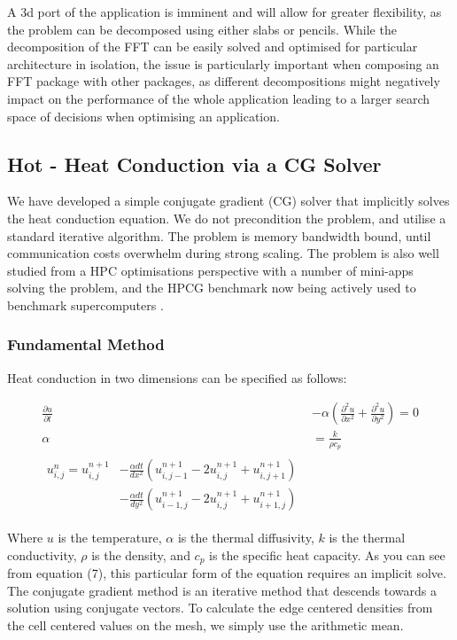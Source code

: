 \documentclass[runningheads,a4paper]{llncs}
\begin{document}
A 3d port of the application is imminent and will allow for greater flexibility, as the problem can be decomposed using either slabs or pencils. While the decomposition of the FFT can be easily solved and optimised for particular architecture in isolation, the issue is particularly important when composing an FFT package with other packages, as different decompositions might negatively impact on the performance of the whole application leading to a larger search space of decisions when optimising an application.

\subsection{Hot - Heat Conduction via a CG Solver}

\label{sec:hot}

We have developed a simple conjugate gradient (CG) solver that implicitly solves the heat conduction equation. We do not precondition the problem, and utilise a standard iterative algorithm. The problem is memory bandwidth bound, until communication costs overwhelm during strong scaling. The problem is also well studied from a HPC optimisations perspective with a number of mini-apps solving the problem, and the HPCG benchmark now being actively used to benchmark supercomputers \cite{Dongarra2013}.

\subsubsection{Fundamental Method}

Heat conduction in two dimensions can be specified as follows:

\begin{align}
    \frac{\partial u}{\partial t} &- \alpha \left(\frac{\partial^2u}{\partial x^2} + \frac{\partial^2u}{\partial y^2}\right) = 0 \\ 
    \alpha &= \frac{k}{\rho c_p} \\
  \begin{split}
    u^n_{i,j} = u^{n+1}_{i,j} 
    & - \frac{\alpha dt}{dx^2}(u^{n+1}_{i,j-1} - 2u^{n+1}_{i,j} + u^{n+1}_{i,j+1}) \\
    & - \frac{\alpha dt}{dy^2}(u^{n+1}_{i-1,j} - 2u^{n+1}_{i,j} + u^{n+1}_{i+1,j})
  \end{split}
\end{align}

Where $u$ is the temperature, $\alpha$ is the thermal diffusivity, $k$ is the thermal conductivity, $\rho$ is the density, and $c_p$ is the specific heat capacity. As you can see from equation (7), this particular form of the equation requires an implicit solve. The conjugate gradient method is an iterative method that descends towards a solution using conjugate vectors. To calculate the edge centered densities from the cell centered values on the mesh, we simply use the arithmetic mean.
\end{document}
